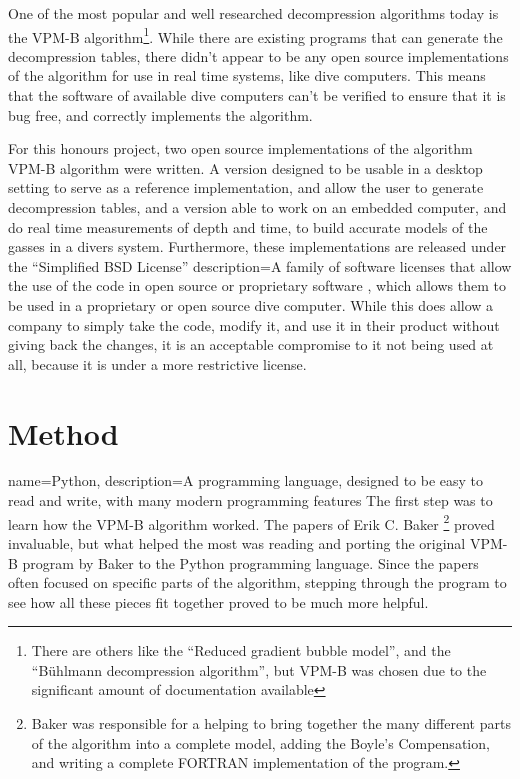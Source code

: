 \documentclass[12pt]{article}
\begin{document}
One of the most popular and well researched decompression algorithms today is the VPM-B algorithm\footnote{There are others like the ``Reduced gradient bubble model'', and the ``B\"uhlmann decompression algorithm'', but VPM-B was chosen due to the significant amount of documentation available}. While there are existing programs that can generate the
decompression tables, there didn't appear to be any open source implementations of the algorithm for use in real
time systems, like dive computers. This means that the software of available dive computers can't be verified to
ensure that it is bug free, and correctly implements the algorithm.

For this honours project, two open source implementations of the algorithm VPM-B algorithm were written. A version designed to be
usable in a desktop setting to serve as a reference implementation, and allow the user to generate decompression
tables, and a version able to work on an embedded computer, and do real time measurements of depth and time, to
build accurate models of the gasses in a divers system. Furthermore, these implementations are released under the
``Simplified BSD License''  { description={A family of software licenses that allow the use of the code in open source or proprietary software}}
, which allows them to be used in a proprietary or open source dive computer. While
this does allow a company to simply take the code, modify it, and use it in their product without
giving back the changes, it is an acceptable compromise to it not being used at all, because it is under
a more restrictive license.

\section{Method}


 { name={Python}, description={A programming language, designed to be easy to read and write, with many
 modern programming features}}
 The first step was to learn how the VPM-B algorithm worked. The papers of Erik C. Baker \footnote{Baker was responsible for a helping to bring together the many different
parts of the algorithm into a complete model, adding the Boyle's Compensation, and writing a complete FORTRAN implementation of the program.} proved invaluable, but what helped the most was reading and porting the original VPM-B
program by Baker to the \gls{Python}
programming language. Since the papers often focused on specific parts of the
algorithm, stepping through the program to see how all these pieces fit together proved to be much more helpful.
\end{document}

